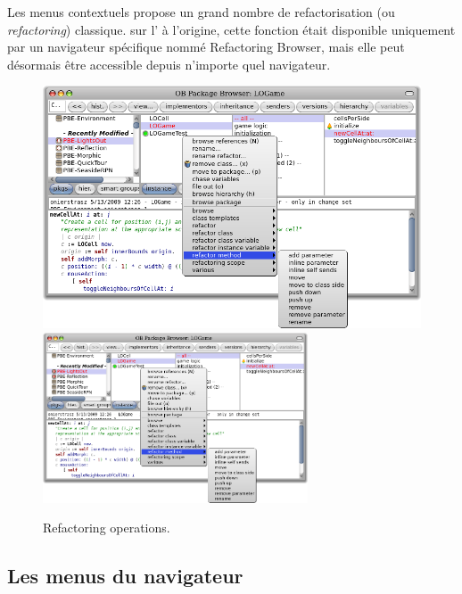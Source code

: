 \documentclass[a4paper,10pt,twoside]{book}
\begin{document}
Les menus contextuels propose un grand nombre de refactorisation (ou
\emph{refactoring}) classique. \Actclickz sur l'
à l'origine, cette fonction était disponible uniquement
par un navigateur spécifique nommé Refactoring Browser, mais
elle peut désormais être accessible depuis n'importe quel
navigateur. %

\begin{figure}[btp]
	\begin{center}
	\ifluluelse
		{\includegraphics[width=\textwidth]{refactoring}}
		{\includegraphics[width=0.7\textwidth]{refactoring}}
	\end{center}
	\caption{Refactoring operations.}
\end{figure} %
\subsection{Les menus du navigateur}
\end{document}
